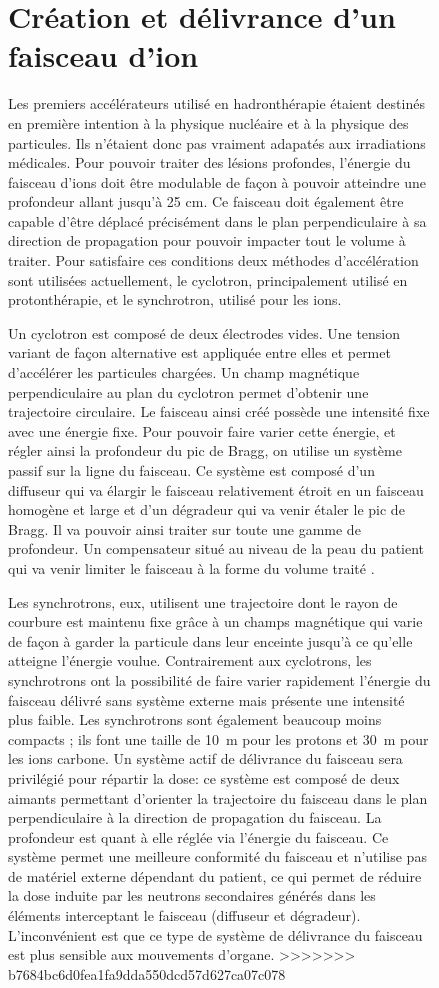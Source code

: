 \documentclass[11pt,a4paper,oldfontcommands]{memoir}
\begin{document}
\begin{figure}
\section{Création et délivrance d'un faisceau d'ion}
Les premiers accélérateurs utilisé en hadronthérapie étaient destinés en première intention à la physique nucléaire et à la physique des particules. Ils n'étaient donc pas vraiment adapatés aux irradiations médicales. Pour pouvoir traiter des lésions profondes, l'énergie du faisceau d'ions doit être modulable de façon à pouvoir atteindre une profondeur allant jusqu'à 25 cm. Ce faisceau doit également être capable d'être déplacé précisément dans le plan perpendiculaire à sa direction de propagation pour pouvoir impacter tout le volume à traiter. Pour satisfaire ces conditions deux méthodes d'accélération sont utilisées actuellement, le cyclotron, principalement utilisé en protonthérapie, et le synchrotron, utilisé pour les ions.

Un cyclotron est composé de deux électrodes vides. Une tension variant de façon alternative est appliquée entre elles et permet d'accélérer les particules chargées. Un champ magnétique perpendiculaire au plan du cyclotron permet d'obtenir une trajectoire circulaire. Le faisceau ainsi créé possède une intensité fixe avec une énergie fixe. Pour pouvoir faire varier cette énergie, et régler ainsi la profondeur du pic de Bragg, on utilise un système passif  sur la ligne du faisceau. Ce système est composé d'un diffuseur qui va élargir le faisceau relativement étroit en un faisceau homogène et large et d'un dégradeur qui va venir étaler le pic de Bragg. Il va pouvoir ainsi traiter sur toute une gamme de profondeur. Un compensateur situé au niveau de la peau du patient qui va venir limiter le faisceau à la forme du volume traité . 

Les synchrotrons, eux, utilisent une trajectoire dont le rayon de courbure est maintenu fixe grâce à un champs magnétique qui varie de façon à garder la particule dans leur enceinte jusqu'à ce qu'elle atteigne l'énergie voulue. Contrairement aux cyclotrons, les synchrotrons ont la possibilité de faire varier rapidement l'énergie du faisceau délivré sans système externe mais présente une intensité plus faible. Les synchrotrons sont également beaucoup moins compacts ; ils font une taille de 10~m pour les protons et 30~m pour les ions carbone. Un système actif de délivrance du faisceau sera privilégié pour répartir la dose: ce système est composé de deux aimants permettant d'orienter la trajectoire du faisceau dans le plan perpendiculaire à la direction de propagation du faisceau. La profondeur est quant à elle réglée via l'énergie du faisceau. Ce système permet une meilleure conformité du faisceau et n'utilise pas de matériel externe dépendant du patient, ce qui permet de réduire la dose induite par les neutrons secondaires générés dans les éléments interceptant le faisceau (diffuseur et dégradeur). L'inconvénient est que ce type de système de délivrance du faisceau est plus sensible aux mouvements d'organe. 
>>>>>>> b7684bc6d0fea1fa9dda550dcd57d627ca07c078


\end{figure}
\end{document}
